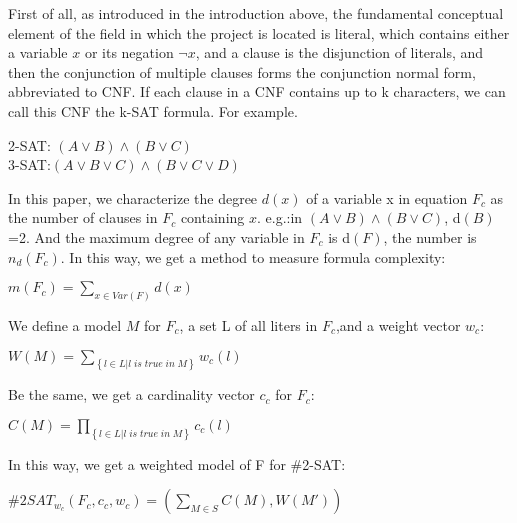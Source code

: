 \documentclass{sigchi}
\begin{document}
First of all, as introduced in the introduction above, the fundamental conceptual element of the field in which the project is located is literal, which contains either a variable $x$ or its negation $\neg x$, and a clause is the disjunction of literals, and then the conjunction of multiple clauses forms the conjunction normal form, abbreviated to CNF.\cite{10.1016/j.tcs.2004.10.037} If each clause in a CNF contains up to k characters, we can call this CNF the k-SAT formula. For example.
\begin{center}
	2-SAT:  $\left ( A \vee B \right )\wedge \left ( B \vee C \right ) $\\3-SAT:$\left ( A \vee B\vee C \right )\wedge \left ( B \vee C\vee D \right )$
\end{center}
In this paper, we characterize the degree $d \left( x \right)$ of a variable x in equation $F_{c}$ as the number of clauses in $F_{c}$ containing $x$.
e.g.:in $\left ( A \vee B \right )\wedge \left ( B \vee C \right ) $, d$\left( B \right)$=2.
And the maximum degree of  any variable in $F_{c}$ is d$\left(F\right)$, the number is $n_{d}\left ( F_{c} \right )$. In this way, we get a method to measure formula complexity:
\begin{center}
	$m\left(F_{c}\right)=\sum_{x\in Var\left(F\right)} d\left(x\right)$
	\cite{10.1016/j.tcs.2004.10.037}
\end{center}
We define a model $M$ for $F_{c}$, a set L of all liters in $F_{c}$,and a weight vector $w_{c}$:
\begin{center}
	$W\left ( M \right )=\sum_{\left \{ l\in L | l\;is\;true\;in\;M\right \}} w_{c}\left ( l \right )$
	\cite{10.1016/j.tcs.2004.10.037}
\end{center}
Be the same, we get a cardinality vector $c_{c}$ for $F_{c}$:
\begin{center}
	$C\left ( M \right )=\prod_{\left \{ l\in L | l\;is\;true\;in\;M\right \}} c_{c}\left ( l \right )$
	\cite{10.1016/j.tcs.2004.10.037}
\end{center}
In this way, we get a weighted model  of F for \#2-SAT:
\begin{center}
	$\#2SAT_{w_{c}}(F_{c}, c_{c}, w_{c})=\left ( \sum_{M\in S}C(M),W({M}') \right )$
	\cite{10.1016/j.tcs.2004.10.037}
\end{center}
\end{document}
